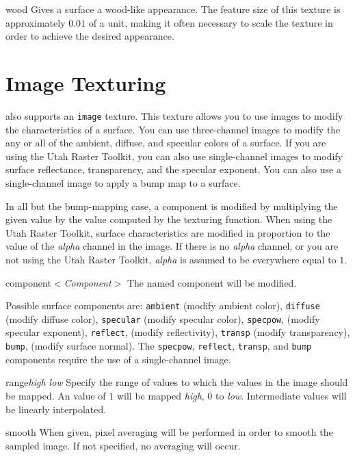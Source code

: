 \begin{defkey}{wood}{}
Gives a surface a wood-like appearance.  The feature size of this texture
is approximately $0.01$ of a unit, making it often necessary to
scale the texture in order to achieve the desired appearance.
\end{defkey}

\section {Image Texturing}

{\Rayshade} also supports an {\tt image} texture.  This texture
allows you to use images to modify the characteristics of a surface.  You
can use three-channel images to modify the any or all of
the ambient, diffuse, and specular colors of a surface.
If you are using the Utah Raster Toolkit,
you can also use single-channel images to modify surface reflectance,
transparency, and the specular exponent.  You can also use a single-channel
image to apply a bump map to a surface.

In all but the bump-mapping case,
a component is modified by multiplying the given value by the value
computed by the texturing function.  When using the Utah Raster Toolkit,
surface characteristics are modified in proportion to the value of
the {\em alpha} channel in the image.  If there is no {\em alpha} channel,
or you are not using the Utah Raster Toolkit, {\em alpha} is assumed to be
everywhere
equal to $1$.

\begin{defkey}{component}{$<${\em Component}$>$}
	The named component will be modified.
\end{defkey}
Possible surface components are:
{\tt ambient} (modify ambient color),
{\tt diffuse} (modify diffuse color),
{\tt specular} (modify specular color),
{\tt specpow}, (modify specular exponent),
{\tt reflect},	(modify reflectivity),
{\tt transp} (modify transparency),
{\tt bump}, (modify surface normal).
The {\tt specpow}, {\tt reflect}, {\tt transp}, and {\tt bump}
components require the use of a single-channel image.

\begin{defkey}{range}{{\em high low}}
	Specify the range of values to which the values in the
	image should be mapped.  An value of $1$ will
	be mapped {\em high}, $0$ to {\em low}.  Intermediate
	values will be linearly interpolated.
\end{defkey}

\begin{defkey}{smooth}{}
	When given, pixel averaging will be performed in order
	to smooth the sampled image.  If not specified, no averaging
	will occur.
\end{defkey}

